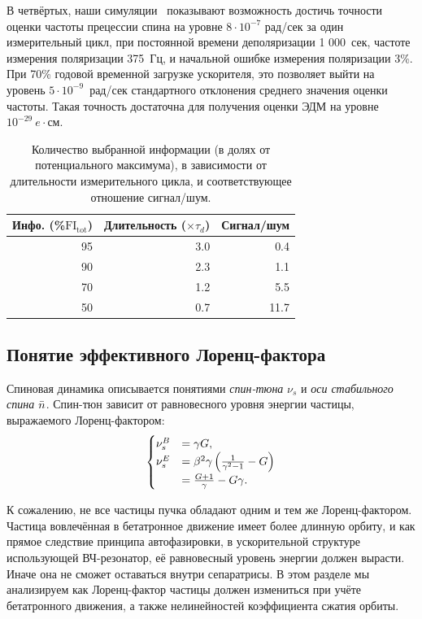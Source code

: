 В четвёртых, наши симуляции~\cite{Aksentev:Stats} показывают 
возможность достичь точности оценки частоты прецессии спина 
на уровне ${8\cdot 10^{-7}}$ рад/сек за один измерительный цикл, при постоянной времени деполяризации 
1 000~сек, частоте измерения поляризации 375~Гц, и начальной ошибке измерения поляризации 3\%. 
При 70\%  годовой временной загрузке ускорителя, это позволяет выйти на уровень 
${5\cdot 10^{-9}}$~рад/сек стандартного отклонения среднего значения оценки частоты. 
Такая точность достаточна для получения оценки ЭДМ на уровне $10^{-29}~e\cdot$см.

\begin{table}[h]
	\caption{Количество выбранной информации (в долях от потенциального максимума), 
		в зависимости от длительности измерительного цикла, 
		и соответствующее отношение сигнал/шум.\label{tbl:FItot}}
	\centering
	\begin{tabular}{rrr}
		\toprule
		Инфо. (\%$\mathrm{FI_{tot}}$) & Длительность ($\times\tau_d$) & Сигнал/шум  \\
		\midrule
		95            & 3.0                     & 0.4         \\
		90            & 2.3                     & 1.1         \\
		70            & 1.2                     & 5.5         \\
		50            & 0.7                     & 11.7        \\
		\bottomrule
	\end{tabular}
\end{table}


\subsection{Понятие эффективного Лоренц-фактора}\label{chpt1:FS-methods:effective-Lorentz-factor}
Спиновая динамика описывается понятиями \emph{спин-тюна} $\nu_s$ и \emph{оси стабильного спина} $\bar n$.
Спин-тюн зависит от равновесного уровня энергии частицы, выражаемого Лоренц-фактором:
\begin{equation}\label{eq:spin_tune_vs_gamma}
\begin{cases}
\nu_s^B &= \gamma G, \\
\nu_s^E &= \beta^2\gamma\bkt{\frac{1}{\gamma^2-1} - G} \\
&= \frac{G+1}{\gamma} - G\gamma.
\end{cases}
\end{equation}

К сожалению, не все частицы пучка обладают одним и тем же Лоренц-фактором. Частица вовлечённая в 
бетатронное движение имеет более длинную орбиту, и как прямое следствие принципа автофазировки,
в ускорительной структуре использующей ВЧ-резонатор, её равновесный уровень энергии 
должен вырасти. Иначе она не сможет оставаться внутри сепаратрисы. В этом разделе мы анализируем как Лоренц-фактор частицы должен измениться при учёте бетатронного движения, а также нелинейностей коэффициента сжатия орбиты.

